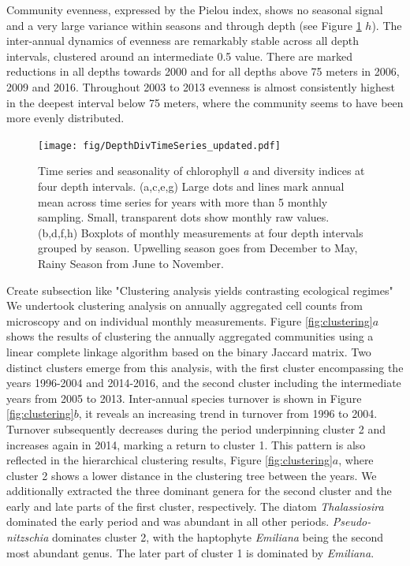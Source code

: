 \documentclass[draft]{agujournal2019}
\begin{document}
Community evenness, expressed by the Pielou index, shows no seasonal signal and a very large variance within seasons and through depth (see Figure \ref{fig:divts} $h$). The inter-annual dynamics of evenness are remarkably stable across all depth intervals, clustered around an intermediate 0.5 value. There are marked reductions in all depths towards 2000 and for all depths above 75 meters in 2006, 2009 and 2016. Throughout 2003 to 2013 evenness is almost consistently highest in the deepest interval below 75 meters, where the community seems to have been more evenly distributed. 


\begin{figure}
\begin{center}
\noindent\texttt{[image: fig/DepthDivTimeSeries\_updated.pdf]}
\end{center}
\caption{Time series and seasonality of chlorophyll \textit{a} and diversity indices at four depth intervals. (a,c,e,g) Large dots and lines mark annual mean across time series for years with more than 5 monthly sampling. Small, transparent dots show monthly raw values. (b,d,f,h) Boxplots of monthly measurements at four depth intervals grouped by season. Upwelling season goes from December to May, Rainy Season from June to November.}
\label{fig:divts}
\end{figure}

Create subsection like "Clustering analysis yields contrasting ecological regimes"
We undertook clustering analysis on annually aggregated cell counts from microscopy and on individual monthly measurements. Figure \ref{fig:clustering}$a$ shows the results of clustering the annually aggregated communities using a linear complete linkage algorithm based on the binary Jaccard matrix. Two distinct clusters emerge from this analysis, with the first cluster encompassing the years 1996-2004 and 2014-2016, and the second cluster including the intermediate years from 2005 to 2013. 
Inter-annual species turnover is shown in Figure \ref{fig:clustering}$b$, it reveals an increasing trend in turnover from 1996 to 2004. Turnover subsequently decreases during the period underpinning cluster 2 and increases again in 2014, marking a return to cluster 1. This pattern is also reflected in the hierarchical clustering results, Figure \ref{fig:clustering}$a$, where cluster 2 shows a lower distance in the clustering tree between the years. We additionally extracted the three dominant genera for the second cluster and the early and late parts of the first cluster, respectively. The diatom \textit{Thalassiosira} dominated the early period and was abundant in all other periods. \textit{Pseudo-nitzschia} dominates cluster 2, with the haptophyte \textit{Emiliana} being the second most abundant genus. The later part of cluster 1 is dominated by \textit{Emiliana}. 
\end{document}
